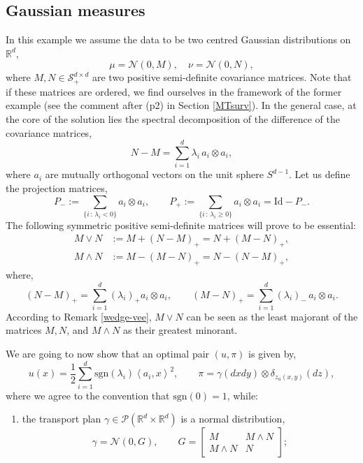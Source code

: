 \documentclass[11pt,letterpaper,reqno]{amsart}
\theoremstyle{definition}
\numberwithin{equation}{section}
\newcommand{\R}{\mathbb{R}}
\newcommand{\Rd}{\R^d}
\newcommand{\Sddp}{{\mathcal{S}^{d\times d}_+}}
\newcommand{\PP}{\mathcal{P}}
\newcommand{\pairing}[1]{{\left \langle #1 \right \rangle}}
\begin{document}
{\subsection{Gaussian measures}
\label{ex:Gaussian}
In this example we assume the data to be two centred Gaussian distributions on $\Rd$,
\begin{equation*}
	\mu = \mathcal{N}(0,M), \quad \nu = \mathcal{N}(0,N),
\end{equation*}
where $M,N \in \Sddp$ are two positive semi-definite covariance matrices.
Note that if these matrices are ordered,  we find ourselves in the framework of the former example (see the comment after 
(p2) in Section \ref{MTsurv}). 
In the general case, at the core of the solution lies the spectral decomposition of the difference of the covariance matrices,
\begin{equation*}
	N-M =  \sum_{i=1}^d \lambda_i\, a_i \otimes a_i,
\end{equation*}
where $a_i$ are mutually orthogonal vectors on the unit sphere $S^{d-1}$. Let us define the projection matrices,
\begin{equation*}
	P_- := \sum_{\{i \, : \, \lambda_i < 0\} }  a_i \otimes a_i, \qquad 	P_+ := \sum_{\{i \, : \, \lambda_i \geq 0\} } a_i \otimes a_i = \mathrm{Id} - P_-.
\end{equation*}
The following symmetric positive semi-definite matrices will prove to be essential:
\begin{align*}
	M \vee N & := M + (N-M)_+ = N + (M-N)_+, \\ 
	M \wedge N &:= M - (M-N)_+ = N - (N-M)_+,
\end{align*}
where,
$$(N-M)_+ =  \sum_{i=1}^d (\lambda_i)_+  a_i \otimes a_i, \qquad (M-N)_+ =   \sum_{i=1}^d (\lambda_i)_-\, a_i \otimes a_i .$$
According to Remark \ref{wedge-vee}, $M \vee N$ can be seen as the least majorant of the matrices $M,N$, and $M\wedge N$ as their greatest minorant.


We are going to now show  that an optimal pair $(u,\pi)$ is given by,
\begin{equation*}
	u(x) = \frac{1}{2} \sum_{i=1}^d \mathrm{sgn}(\lambda_i) \pairing{a_i,x}^2,  \qquad  	\pi = \gamma(dxdy) \otimes \delta_{z_u(x,y)}(dz),
\end{equation*}
where we agree to the convention that $\mathrm{sgn}(0) = 1$, while:
\begin{enumerate}
\item[-] the transport plan $\gamma \in \PP(\Rd \times\Rd)$ is  a normal distribution,
\begin{equation*}
	\gamma = \mathcal{N}\left(0,G \right), \qquad G = \begin{bmatrix}
		M & M \wedge N \\
		M \wedge N  & N
	\end{bmatrix};
\end{equation*}


\end{enumerate}}
\end{document}
